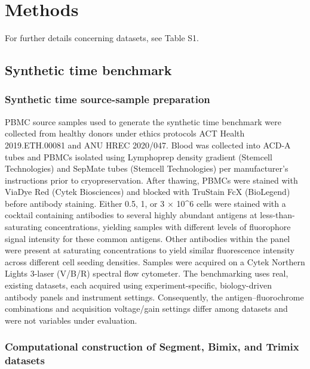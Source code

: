\documentclass[ASNA]{latex/wiley/USG}
\begin{document}
\FloatBarrier

\section{Methods}\label{methods}

For further details concerning datasets, see Table S1.

\subsection{Synthetic time benchmark}\label{synthetic-time-benchmark}

\subsubsection{Synthetic time source-sample
preparation}\label{synthetic-time-source-sample-preparation}

PBMC source samples used to generate the synthetic time benchmark were
collected from healthy donors under ethics protocols ACT Health
2019.ETH.00081 and ANU HREC 2020/047. Blood was collected into ACD-A
tubes and PBMCs isolated using Lymphoprep density gradient (Stemcell
Technologies) and SepMate tubes (Stemcell Technologies) per
manufacturer's instructions prior to cryopreservation. After thawing,
PBMCs were stained with ViaDye Red (Cytek Biosciences) and blocked with
TruStain FcX (BioLegend) before antibody staining. Either 0.5, 1, or 3 ×
10\^{}6 cells were stained with a cocktail containing antibodies to
several highly abundant antigens at less-than-saturating concentrations,
yielding samples with different levels of fluorophore signal intensity
for these common antigens. Other antibodies within the panel were
present at saturating concentrations to yield similar fluorescence
intensity across different cell seeding densities. Samples were acquired
on a Cytek Northern Lights 3-laser (V/B/R) spectral flow cytometer. The
benchmarking uses real, existing datasets, each acquired using
experiment-specific, biology-driven antibody panels and instrument
settings. Consequently, the antigen--fluorochrome combinations and
acquisition voltage/gain settings differ among datasets and were not
variables under evaluation.

\subsubsection{Computational construction of Segment, Bimix, and Trimix
datasets}\label{computational-construction-of-segment-bimix-and-trimix-datasets}
\end{document}
